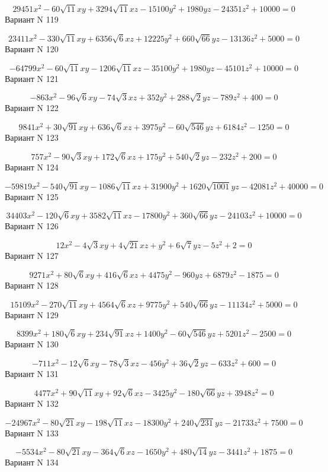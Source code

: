 \documentclass[11pt]{report}
\begin{document}
$$29451 x^{2} - 60 \sqrt{11} x y + 3294 \sqrt{11} x z - 15100 y^{2} + 1980 y z - 24351 z^{2} + 10000 = 0$$Вариант N 119

$$23411 x^{2} - 330 \sqrt{11} x y + 6356 \sqrt{6} x z + 12225 y^{2} + 660 \sqrt{66} y z - 13136 z^{2} + 5000 = 0$$Вариант N 120

$$- 64799 x^{2} - 60 \sqrt{11} x y - 1206 \sqrt{11} x z - 35100 y^{2} + 1980 y z - 45101 z^{2} + 10000 = 0$$Вариант N 121

$$- 863 x^{2} - 96 \sqrt{6} x y - 74 \sqrt{3} x z + 352 y^{2} + 288 \sqrt{2} y z - 789 z^{2} + 400 = 0$$Вариант N 122

$$9841 x^{2} + 30 \sqrt{91} x y + 636 \sqrt{6} x z + 3975 y^{2} - 60 \sqrt{546} y z + 6184 z^{2} - 1250 = 0$$Вариант N 123

$$757 x^{2} - 90 \sqrt{3} x y + 172 \sqrt{6} x z + 175 y^{2} + 540 \sqrt{2} y z - 232 z^{2} + 200 = 0$$Вариант N 124

$$- 59819 x^{2} - 540 \sqrt{91} x y - 1086 \sqrt{11} x z + 31900 y^{2} + 1620 \sqrt{1001} y z - 42081 z^{2} + 40000 = 0$$Вариант N 125

$$34403 x^{2} - 120 \sqrt{6} x y + 3582 \sqrt{11} x z - 17800 y^{2} + 360 \sqrt{66} y z - 24103 z^{2} + 10000 = 0$$Вариант N 126

$$12 x^{2} - 4 \sqrt{3} x y + 4 \sqrt{21} x z + y^{2} + 6 \sqrt{7} y z - 5 z^{2} + 2 = 0$$Вариант N 127

$$9271 x^{2} + 80 \sqrt{6} x y + 416 \sqrt{6} x z + 4475 y^{2} - 960 y z + 6879 z^{2} - 1875 = 0$$Вариант N 128

$$15109 x^{2} - 270 \sqrt{11} x y + 4564 \sqrt{6} x z + 9775 y^{2} + 540 \sqrt{66} y z - 11134 z^{2} + 5000 = 0$$Вариант N 129

$$8399 x^{2} + 180 \sqrt{6} x y + 234 \sqrt{91} x z + 1400 y^{2} - 60 \sqrt{546} y z + 5201 z^{2} - 2500 = 0$$Вариант N 130

$$- 711 x^{2} - 12 \sqrt{6} x y - 78 \sqrt{3} x z - 456 y^{2} + 36 \sqrt{2} y z - 633 z^{2} + 600 = 0$$Вариант N 131

$$4477 x^{2} + 90 \sqrt{11} x y + 92 \sqrt{6} x z - 3425 y^{2} - 180 \sqrt{66} y z + 3948 z^{2} = 0$$Вариант N 132

$$- 24967 x^{2} - 80 \sqrt{21} x y - 198 \sqrt{11} x z - 18300 y^{2} + 240 \sqrt{231} y z - 21733 z^{2} + 7500 = 0$$Вариант N 133

$$- 5534 x^{2} - 80 \sqrt{21} x y - 364 \sqrt{6} x z - 1650 y^{2} + 480 \sqrt{14} y z - 3441 z^{2} + 1875 = 0$$Вариант N 134
\end{document}
